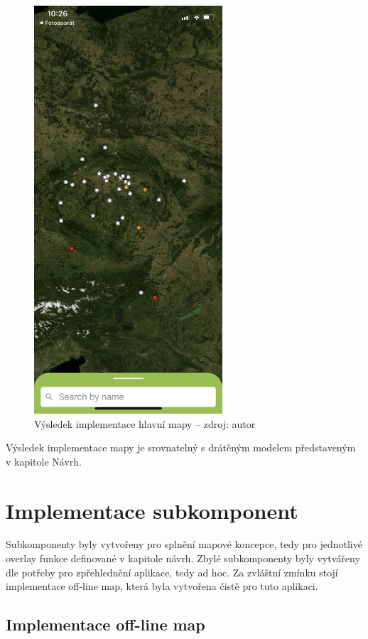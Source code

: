 \begin{figure}[H]
	\begin{center}
		\includegraphics[width=70mm]{img/example_map.jpg}
	\end{center}
	\caption[Výsledek implementace hlavní mapy]{Výsledek implementace hlavní mapy -- zdroj: autor}
\end{figure}

Výsledek implementace mapy je srovnatelný s drátěným modelem představeným v kapitole Návrh.

\section{Implementace subkomponent}

Subkomponenty byly vytvořeny pro splnění mapové koncepce, tedy pro jednotlivé overlay funkce definované v kapitole návrh. Zbylé subkomponenty byly vytvářeny dle potřeby pro zpřehlednění aplikace, tedy ad hoc. Za zvláštní zmínku stojí implementace off-line map, která byla vytvořena čistě pro tuto aplikaci.

\subsection{Implementace off-line map}

